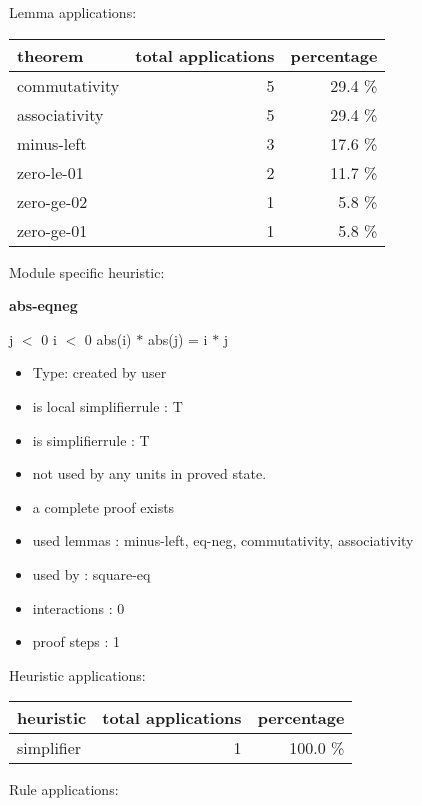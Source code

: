 \documentclass[a4paper]{article}
\begin{document}
Lemma applications:

\begin{supertabular}{l|r|r}
theorem	        & total applications & percentage \\ \hline
commutativity & 5 & 29.4 \% \\
associativity & 5 & 29.4 \% \\
minus-left & 3 & 17.6 \% \\
zero-le-01 & 2 & 11.7 \% \\
zero-ge-02 & 1 & 5.8 \% \\
zero-ge-01 & 1 & 5.8 \% \\

\end{supertabular}

Module specific heuristic:

\pagebreak

{\LARGE\bf abs-eqneg}\label{lemma-abs-eqneg}

\medskip

 \Fol j $<$ 0 \And i $<$ 0 \Imp abs(i) $*$ abs(j) = i $*$ j

\begin{itemize}

\item Type: created by user

\item is local simplifierrule : T
\item is simplifierrule : T
\item not used by any units in proved state.
\item       a complete proof exists
\item       used lemmas  : minus-left, eq-neg, commutativity, associativity
\item       used by      : square-eq
\item       interactions : 0
\item       proof steps  : 1
\end{itemize}

\medskip


Heuristic applications:

\begin{supertabular}{l|r|r}
heuristic	& total applications & percentage \\ \hline
simplifier & 1 & 100.0 \% \\

\end{supertabular}

Rule applications:
\end{document}
